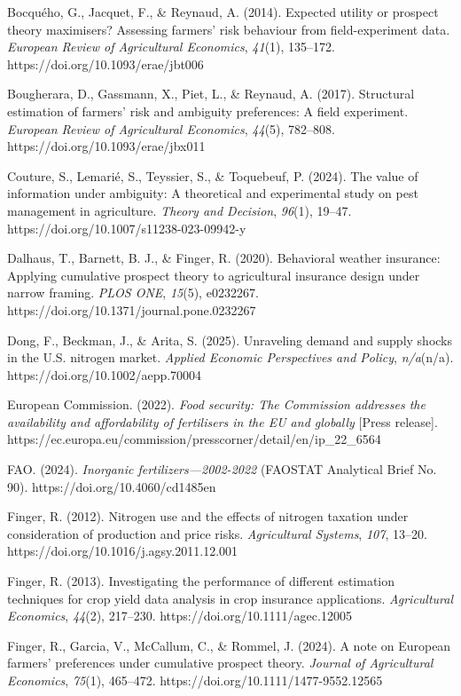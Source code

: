 \documentclass[
]{article}
\begin{document}
Bocquého, G., Jacquet, F., \& Reynaud, A. (2014). Expected utility or
prospect theory maximisers? Assessing farmers' risk behaviour from
field-experiment data. \emph{European Review of Agricultural Economics},
\emph{41}(1), 135--172. https://doi.org/10.1093/erae/jbt006

Bougherara, D., Gassmann, X., Piet, L., \& Reynaud, A. (2017).
Structural estimation of farmers' risk and ambiguity preferences: A
field experiment. \emph{European Review of Agricultural Economics},
\emph{44}(5), 782--808. https://doi.org/10.1093/erae/jbx011

Couture, S., Lemarié, S., Teyssier, S., \& Toquebeuf, P. (2024). The
value of information under ambiguity: A theoretical and experimental
study on pest management in agriculture. \emph{Theory and Decision},
\emph{96}(1), 19--47. https://doi.org/10.1007/s11238-023-09942-y

Dalhaus, T., Barnett, B. J., \& Finger, R. (2020). Behavioral weather
insurance: Applying cumulative prospect theory to agricultural insurance
design under narrow framing. \emph{PLOS ONE}, \emph{15}(5), e0232267.
https://doi.org/10.1371/journal.pone.0232267

Dong, F., Beckman, J., \& Arita, S. (2025). Unraveling demand and supply
shocks in the U.S. nitrogen market. \emph{Applied Economic Perspectives
and Policy}, \emph{n/a}(n/a). https://doi.org/10.1002/aepp.70004

European Commission. (2022). \emph{Food security: The Commission
addresses the availability and affordability of fertilisers in the EU
and globally} {[}Press release{]}.
https://ec.europa.eu/commission/presscorner/detail/en/ip\_22\_6564

FAO. (2024). \emph{Inorganic fertilizers---2002-2022} (FAOSTAT
Analytical Brief No. 90). https://doi.org/10.4060/cd1485en

Finger, R. (2012). Nitrogen use and the effects of nitrogen taxation
under consideration of production and price risks. \emph{Agricultural
Systems}, \emph{107}, 13--20. https://doi.org/10.1016/j.agsy.2011.12.001

Finger, R. (2013). Investigating the performance of different estimation
techniques for crop yield data analysis in crop insurance applications.
\emph{Agricultural Economics}, \emph{44}(2), 217--230.
https://doi.org/10.1111/agec.12005

Finger, R., Garcia, V., McCallum, C., \& Rommel, J. (2024). A note on
European farmers' preferences under cumulative prospect theory.
\emph{Journal of Agricultural Economics}, \emph{75}(1), 465--472.
https://doi.org/10.1111/1477-9552.12565
\end{document}
